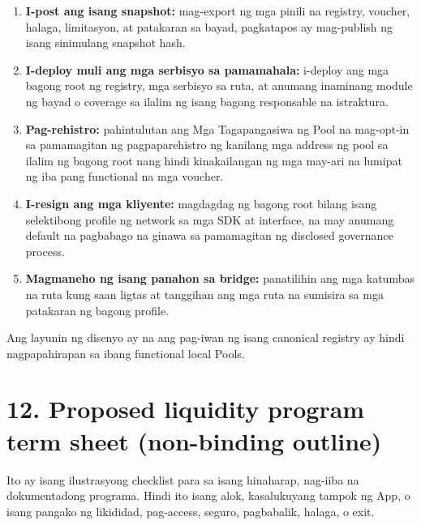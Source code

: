 \documentclass[11pt]{article}
\begin{document}
\begin{enumerate}[leftmargin=*]
\item \textbf{I-post ang isang snapshot:} mag-export ng mga pinili na registry, voucher, halaga, limitasyon, at patakaran sa bayad, pagkatapos ay mag-publish ng isang sinimulang snapshot hash.
\item \textbf{I-deploy muli ang mga serbisyo sa pamamahala:} i-deploy ang mga bagong root ng registry, mga serbisyo sa ruta, at anumang inaminang module ng bayad o coverage sa ilalim ng isang bagong responsable na istraktura.
\item \textbf{Pag-rehistro:} pahintulutan ang Mga Tagapangasiwa ng Pool na mag-opt-in sa pamamagitan ng pagpaparehistro ng kanilang mga address ng pool sa ilalim ng bagong root nang hindi kinakailangan ng mga may-ari na lumipat ng iba pang functional na mga voucher.
\item \textbf{I-resign ang mga kliyente:} magdagdag ng bagong root bilang isang selektibong profile ng network sa mga SDK at interface, na may anumang default na pagbabago na ginawa sa pamamagitan ng disclosed governance process.
\item \textbf{Magmaneho ng isang panahon sa bridge:} panatilihin ang mga katumbas na ruta kung saan ligtas at tanggihan ang mga ruta na sumisira sa mga patakaran ng bagong profile.
\end{enumerate}
Ang layunin ng disenyo ay na ang pag-iwan ng isang canonical registry ay hindi nagpapahirapan sa ibang functional local Pools.


\section*{12. Proposed liquidity program term sheet (non-binding outline)}

Ito ay isang ilustrasyong checklist para sa isang hinaharap, nag-iiba na dokumentadong programa. Hindi ito isang alok, kasalukuyang tampok ng App, o isang pangako ng likididad, pag-access, seguro, pagbabalik, halaga, o exit.
\end{document}
